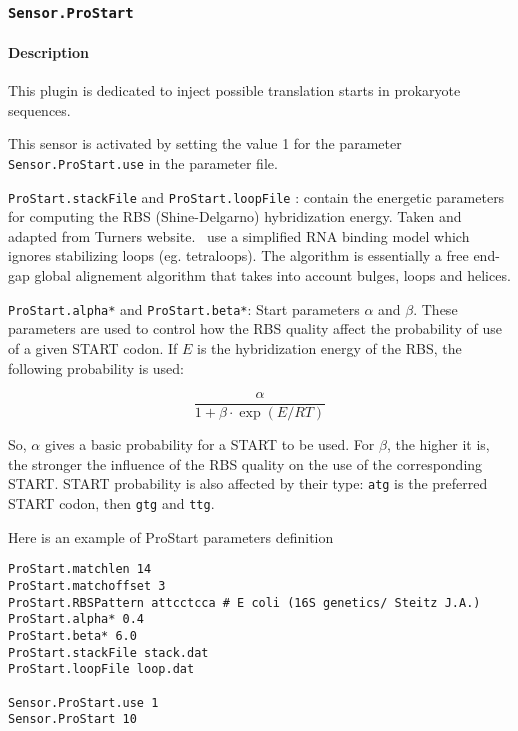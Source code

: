 
\subsubsection{\texttt{Sensor.ProStart}}
\label{prostart}
\paragraph{Description}

This plugin is dedicated to inject possible translation starts in prokaryote sequences.

This sensor is activated by setting the value 1 for the parameter \texttt{Sensor.ProStart.use} in the parameter file.

\texttt{ProStart.stackFile} and \texttt{ProStart.loopFile} : contain the energetic parameters for computing the RBS 
(Shine-Delgarno) hybridization energy. Taken and adapted from Turners website.
\EuGene\ use a simplified RNA binding model which ignores stabilizing loops (eg. tetraloops). 
The algorithm is essentially a free end-gap global alignement algorithm that takes into account bulges, loops and helices.

\texttt{ProStart.alpha*} and \texttt{ProStart.beta*}: Start parameters $\alpha$ and $\beta$. 
These parameters are used to control how the RBS quality affect the probability of use of a given START codon. 
If $E$ is the hybridization energy of the RBS, the following probability is used:

\[\frac{\alpha}{1+\beta\cdot\exp(E/RT)}\]
  
So, $\alpha$ gives a basic probability for a START to be used. For $\beta$, the
higher it is, the stronger the influence of the RBS quality on the use of
the corresponding START.  START probability is also affected by their type: 
\texttt{atg} is the preferred START codon, then \texttt{gtg} and \texttt{ttg}.

Here is an example of ProStart parameters definition

\begin{Verbatim}[fontsize=\small]
ProStart.matchlen 14
ProStart.matchoffset 3
ProStart.RBSPattern attcctcca # E coli (16S genetics/ Steitz J.A.)
ProStart.alpha* 0.4
ProStart.beta* 6.0
ProStart.stackFile stack.dat
ProStart.loopFile loop.dat

Sensor.ProStart.use 1
Sensor.ProStart 10
\end{Verbatim}
                                                           
